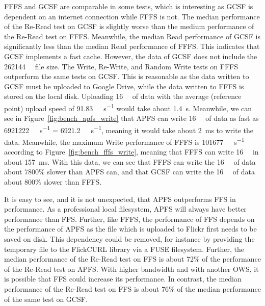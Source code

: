 \gls{FFFS} and \gls{GCSF} are comparable in some tests, which is interesting as \gls{GCSF} is dependent on an internet connection while \gls{FFFS} is not. The median performance of the \mbox{Re-Read} test on \gls{GCSF} is slightly worse than the medium performance of the \mbox{Re-Read} test on \gls{FFFS}. Meanwhile, the median Read performance of \gls{GCSF} is significantly less than the median Read performance of \gls{FFFS}. This indicates that \gls{GCSF} implements a fast cache. However, the data of \gls{GCSF} does not include the \SI{262144}{\kilo\byte} file size. The Write, \mbox{Re-Write}, and Random Write tests on \gls{FFFS} outperform the same tests on \gls{GCSF}. This is reasonable as the data written to \gls{GCSF} must be uploaded to Google Drive, while the data written to \gls{FFFS} is stored on the local disk. Uploading \SI{16}{\mega\byte} of data with the average (reference point) upload speed of \SI[per-mode = symbol]{91.83}{\mega\bit\per\second} would take about \SI{1.4}{\second}. Meanwhile, we can see in Figure~\ref{fig:bench_apfs_write} that \gls{APFS} can write \SI{16}{\mega\byte} of data as fast as \SI[per-mode = symbol]{6921222}{\kilo\byte\per\second} = \SI[per-mode = symbol]{6921.2}{\mega\byte\per\second}, meaning it would take about \SI{2}{\milli\second} to write the data. Meanwhile, the maximum Write performance of \gls{FFFS} is \SI[per-mode = symbol]{101677}{\kilo\byte\per\second} according to Figure~\ref{fig:bench_fffs_write}, meaning that \gls{FFFS} can write \SI{16}{\mega\byte} in about \SI{157}{\milli\second}. With this data, we can see that \gls{FFFS} can write the \SI{16}{\mega\byte} of data about 7800\% slower than \gls{APFS} can, and that \gls{GCSF} can write the \SI{16}{\mega\byte} of data about 800\% slower than \gls{FFFS}. 

It is easy to see, and it is not unexpected, that \gls{APFS} outperforms \gls{FFS} in performance. As a professional local filesystem, \gls{APFS} will always have better performance than FFS. Further, like \gls{FFFS}, the performance of \gls{FFS} depends on the performance of \gls{APFS} as the file which is uploaded to Flickr first needs to be saved on disk. This dependency could be removed, for instance by providing the temporary file to the FlickCURL library via a \gls{FUSE} filesystem. Further, the median performance of the \mbox{Re-Read} test on \gls{FFS} is about 72\% of the performance of the \mbox{Re-Read} test on \gls{APFS}. With higher bandwidth and with another \gls{OWS}, it is possible that \gls{FFS} could increase its performance. In contrast, the median performance of the \mbox{Re-Read} test on \gls{FFS} is about 76\% of the median performance of the same test on \gls{GCSF}.


